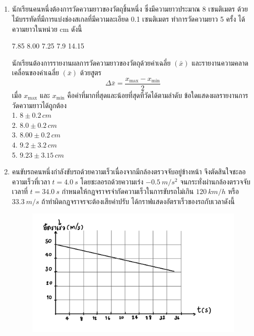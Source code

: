 \documentclass[a4paper,12pt]{article}
\begin{document}
	\begin{titlepage}
	{\Huge{
			\vspace*{\fill}
			\noindent
			}
		\\\\
		{\Large{
				}
			\\\\	
		}}
	\vfill
	\end{titlepage}
	\begin{enumerate}
		\item นักเรียนคนหนึ่งต้องการวัดความยาวของวัตถุชิ้นหนึ่ง ซึ่งมีความยาวประมาณ 8 เซนติเมตร ด้วยไม้บรรทัดที่มีการแบ่งช่องสเกลที่มีความละเอียด 0.1 เซนติเมตร ทำการวัดความยาว 5 ครั้ง ได้ความยาวในหน่วย cm ดังนี้
		\begin{center}
			7.85 8.00 7.25 7.9 14.15
		\end{center}
		นักเรียนต้องการรายงานผลการวัดความยาวของวัตถุด้วยค่าเฉลี่ย \((\bar{x})\) 			และรายงานความคลาดเคลื่อนของค่าเฉลี่ย \((\bar{x})\) ด้วยสูตร
		\[\Delta \bar{x}=\frac{x_{\text{max}}-x_\text{min}}{2}\]
		เมื่อ \(x_{\text{max}}\) และ \(x_{\text{min}}\) คือค่าที่มากที่สุดและน้อยที่สุดที่วัดได้ตามลำดับ ข้อใดแสดงผลรายงานการวัดความยาวได้ถูกต้อง\\
		1. \(8\pm0.2\,\si{cm}\)\\
		2. \(8.0\pm0.2\,\si{cm}\)\\
		3. \(8.00\pm0.2\,\si{cm}\)\\
		4. \(9.2\pm3.2\,\si{cm}\)\\
		5. \(9.23\pm3.15\,\si{cm}\)
		\item คนขับรถคนหนึ่งกำลังขับรถด้วยความเร็วเนื่องจากมีกล้องตรวจจับอยู่ข้างหน้า จึงตัดสินใจชะลอความเร็วที่เวลา \(t=\SI{4.0}{s}\) โดยชะลอรถด้วยความเร่ง \(\SI{-0.5}{m/s^2}\) จนกระทั่งผ่านกล้องตรวจจับเวลาที่ \(t=\SI{34.0}{s}\) กำหนดให้กฎจราจรจำกัดความเร็วในการขับรถไม่เกิน \(\SI{120}{km/h}\) หรือ \(\SI{33.3}{m/s}\) ถ้าทำผิดกฎจราจรจะต้องเสียค่าปรับ ได้กราฟแสดงอัตราเร็วของรถกับเวลาดังนี้
		\begin{figure}[h]
			\centering
			\includegraphics[width=0.7\linewidth]{2}
		\end{figure}
		

\end{enumerate}
\end{document}
